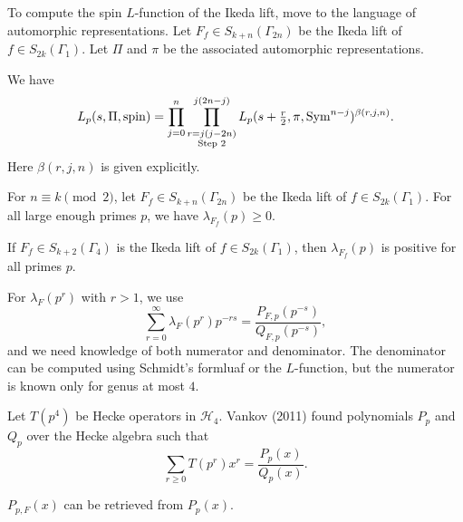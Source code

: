 \documentclass[reqno]{amsart} 
\begin{document}
To compute the spin $L$-function of the Ikeda lift, move to the language of automorphic representations.  Let $F_f \in S_{k + n}(\Gamma_{2 n})$ be the Ikeda lift of $f \in S_{2 k}(\Gamma_1)$.  Let $\Pi$ and $\pi$ be the associated automorphic representations.
\begin{theorem}[Schmidt, 2003]
  We have
  \begin{equation*}
    L_p(s, \Pi, \mathrm{spin})
    = \prod_{j = 0}^n
    \prod_{
      \substack{
        r = j(j - 2 n)  \\
        \text{Step }2
      }
    }^{j(2n - j)}
    L_p(s + \tfrac{r}{2}, \pi, \operatorname{Sym}^{n - j})^{\beta(r, j, n)}.
  \end{equation*}
  Here $\beta(r, j, n)$ is given explicitly.
\end{theorem}

\begin{theorem}[A, 2024]
  For $n \equiv k \pmod{2}$, let $F_f \in S_{k + n}(\Gamma_{2 n})$ be the Ikeda lift of $f \in S_{2 k}(\Gamma_1)$.  For all large enough primes $p$, we have $\lambda_{F_f}(p) \geq 0$.
\end{theorem}

\begin{lemma}
  If $F_f \in S_{k + 2}(\Gamma_4)$ is the Ikeda lift of $f \in S_{2 k}(\Gamma_1)$, then $\lambda_{F_f}(p)$ is positive for all primes $p$.
\end{lemma}

For $\lambda_F(p^r)$ with $r > 1$, we use
\begin{equation*}
  \sum_{r = 0}^\infty \lambda_F(p^r) p^{- r s}
  = \frac{P_{F, p}(p^{- s})}{Q_{F, p}(p^{- s})},
\end{equation*}
and we need knowledge of both numerator and denominator.  The denominator can be computed using Schmidt's formluaf or the $L$-function, but the numerator is known only for genus at most $4$.

Let $T(p^4)$ be Hecke operators in $\mathcal{H}_4$.  Vankov (2011) found polynomials $P_p$ and $Q_p$ over the Hecke algebra such that
\begin{equation*}
  \sum_{r \geq 0} T(p^r) x^r = \frac{P_p(x)}{ Q_p(x)}.
\end{equation*}

$P_{p, F}(x)$ can be retrieved from $P_p(x)$.
\end{document}
